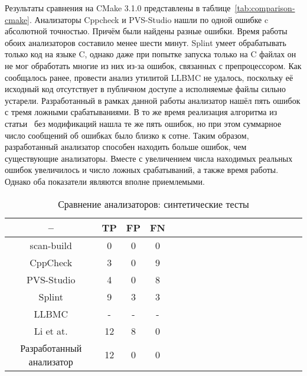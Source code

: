 Результаты сравнения на CMake 3.1.0 представлены в
таблице~\ref{tab:comparison-cmake}. Анализаторы Cppcheck и PVS-Studio
нашли по одной ошибке c абсолютной точностью. Причём были найдены
разные ошибки. Время работы обоих анализаторов составило менее шести
минут. Splint умеет обрабатывать только код на языке C, однако даже
при попытке запуска только на C файлах он не мог обработать многие из
них из-за ошибок, связанных с препроцессором. Как сообщалось ранее,
провести анализ утилитой LLBMC не удалось, поскольку её исходный код
отсутствует в публичном доступе а исполняемые файлы сильно
устарели. Разработанный в рамках данной работы анализатор нашёл пять
ошибок с тремя ложными срабатываниями. В то же время реализация
алгоритма из статьи~\cite{li2010practical} без модификаций нашла те же
пять ошибок, но при этом суммарное число сообщений об ошибках было
близко к сотне. Таким образом, разработанный анализатор способен
находить больше ошибок, чем существующие анализаторы. Вместе с
увеличением числа находимых реальных ошибок увеличилось и число ложных
срабатываний, а также время работы. Однако оба показатели являются
вполне приемлемыми.

\begin{table}[!h]
\caption{Сравнение анализаторов: синтетические тесты}\label{tab:comparison-synthetic}
\centering
  \begin{tabular}{|*{18}{c|}}\hline
  --                       & TP  & FP & FN \\\hline
  scan-build               & 0   & 0  & 0  \\\hline
  CppCheck                 & 3   & 0  & 9  \\\hline
  PVS-Studio               & 4   & 0  & 8  \\\hline
  Splint                   & 9   & 3  & 3  \\\hline
  LLBMC                    & -   & -  & -  \\\hline
  Li et at.                & 12  & 8  & 0  \\\hline
  Разработанный анализатор & 12  & 0  & 0  \\\hline
  \end{tabular}
\end{table}


